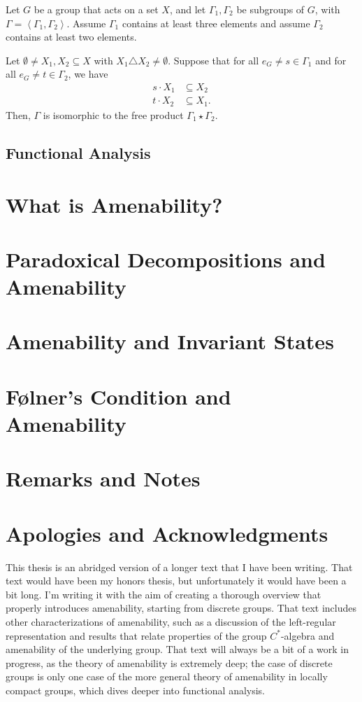 \documentclass[10pt]{mypackage2}
\begin{document}
\begin{theorem}\label{thm:ping_pong_lemma}
  Let $G$ be a group that acts on a set $X$, and let $\Gamma_1,\Gamma_2$ be subgroups of $G$, with $\Gamma = \left\langle \Gamma_1,\Gamma_2 \right\rangle$. Assume $\Gamma_1$ contains at least three elements and assume $\Gamma_2$ contains at least two elements.\newline

  Let $\emptyset\neq X_1,X_2\subseteq X$ with $X_1\triangle X_2\neq\emptyset$. Suppose that for all $e_G\neq s\in \Gamma_1$ and for all $e_G\neq t\in \Gamma_2$, we have
  \begin{align*}
    s\cdot X_1&\subseteq X_2\\
    t\cdot X_2&\subseteq X_1.
  \end{align*}
  Then, $\Gamma$ is isomorphic to the free product $\Gamma_1\star \Gamma_2$.
\end{theorem}
\subsection{Functional Analysis}%
\section{What is Amenability?}%
\section{Paradoxical Decompositions and Amenability}%
\section{Amenability and Invariant States}%
\section{Følner's Condition and Amenability}%
\section{Remarks and Notes}%
\section{Apologies and Acknowledgments}%
This thesis is an abridged version of a longer text that I have been writing. That text would have been my honors thesis, but unfortunately it would have been a bit long. I'm writing it with the aim of creating a thorough overview that properly introduces amenability, starting from discrete groups. That text includes other characterizations of amenability, such as a discussion of the left-regular representation and results that relate properties of the group $C^{\ast}$-algebra and amenability of the underlying group. That text will always be a bit of a work in progress, as the theory of amenability is extremely deep; the case of discrete groups is only one case of the more general theory of amenability in locally compact groups, which dives deeper into functional analysis.\newline
\end{document}
